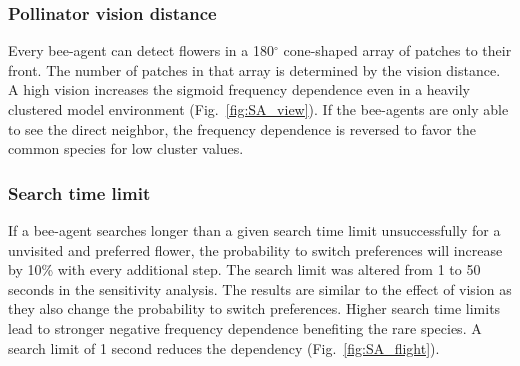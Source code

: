 
\subsubsection*{Pollinator vision distance}
Every bee-agent can detect flowers in a 180$^{\circ}$ cone-shaped array of patches to their front. The number of patches in that array is determined by the vision distance. A high vision increases the sigmoid frequency dependence even in a heavily clustered model environment (Fig.~\ref{fig:SA_view}). If the bee-agents are only able to see the direct neighbor, the frequency dependence is reversed to favor the common species for low cluster values. 


\subsubsection*{Search time limit}
If a bee-agent searches longer than a given search time limit unsuccessfully for a unvisited and preferred flower, the probability to switch preferences will increase by 10\% with every additional step. The search limit was altered from 1 to 50 seconds in the sensitivity analysis. The results are similar to the effect of vision as they also change the probability to switch preferences. Higher search time limits lead to stronger negative frequency dependence benefiting the rare species. A search limit of 1 second reduces the dependency (Fig.~\ref{fig:SA_flight}).

 

